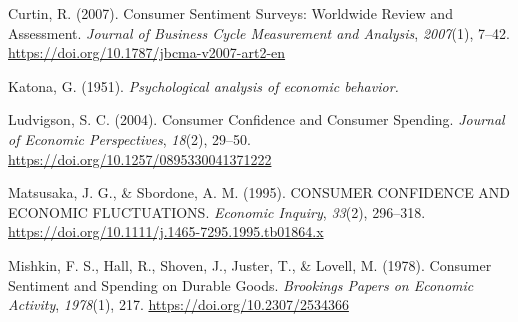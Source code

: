 \documentclass[
  a4paper,
  abstract]{scrartcl}
\newlength{\cslhangindent}
\newenvironment{CSLReferences}[2] %
 {\begin{list}{}{%
  \setlength{\itemindent}{0pt}
  \setlength{\leftmargin}{0pt}
  \setlength{\parsep}{0pt}
  \ifodd #1
   \setlength{\leftmargin}{\cslhangindent}
   \setlength{\itemindent}{-1\cslhangindent}
  \fi
  \setlength{\itemsep}{#2\baselineskip}}}
 {\end{list}}
\begin{document}
\label{refs}
\begin{CSLReferences}{1}{0}
Curtin, R. (2007). Consumer {Sentiment} {Surveys}: {Worldwide} {Review}
and {Assessment}. \emph{Journal of Business Cycle Measurement and
Analysis}, \emph{2007}(1), 7--42.
\url{https://doi.org/10.1787/jbcma-v2007-art2-en}

Katona, G. (1951). \emph{Psychological analysis of economic behavior.}

Ludvigson, S. C. (2004). Consumer {Confidence} and {Consumer}
{Spending}. \emph{Journal of Economic Perspectives}, \emph{18}(2),
29--50. \url{https://doi.org/10.1257/0895330041371222}

Matsusaka, J. G., \& Sbordone, A. M. (1995). {CONSUMER} {CONFIDENCE}
{AND} {ECONOMIC} {FLUCTUATIONS}. \emph{Economic Inquiry}, \emph{33}(2),
296--318. \url{https://doi.org/10.1111/j.1465-7295.1995.tb01864.x}

Mishkin, F. S., Hall, R., Shoven, J., Juster, T., \& Lovell, M. (1978).
Consumer {Sentiment} and {Spending} on {Durable} {Goods}.
\emph{Brookings Papers on Economic Activity}, \emph{1978}(1), 217.
\url{https://doi.org/10.2307/2534366}

\end{CSLReferences}
\end{document}
